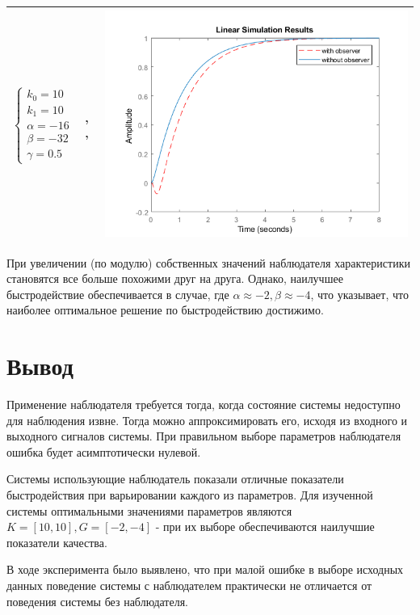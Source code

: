 \begin{longtable}{ | m{2cm} | m{4cm} | m{10cm} | }
		$\begin{cases} k_0=10 \\ k_1=10 \\ \alpha=-16 \\ \beta= -32 \\ \gamma=0.5 \end{cases}$ &
		\text{С наблюдателем:}\linebreak
		\text{$\Omega=8.61$}, \text{$MinRe=0.97$} 
		\text{Без наблюдателя:}\linebreak
		\text{$\Omega=3.27$}, \text{$MinRe=0.97$} & 
		\begin{minipage}{.3\textwidth}
			\includegraphics[scale = 0.6]{images/g3.png}
		\end{minipage}
		\\\hline
		
\end{longtable}

\FloatBarrier

При увеличении (по модулю) собственных значений наблюдателя характеристики становятся все больше похожими друг на друга. Однако, наилучшее быстродействие обеспечивается в случае, где $\alpha\approx-2, \beta\approx-4$, что указывает, что наиболее оптимальное решение по быстродействию достижимо.

\section{Вывод}

Применение наблюдателя требуется тогда, когда состояние системы недоступно для наблюдения извне. Тогда можно аппроксимировать его, исходя из входного и выходного сигналов системы. При правильном выборе параметров наблюдателя ошибка будет асимптотически нулевой.

Системы использующие наблюдатель показали отличные показатели быстродействия при варьировании каждого из параметров. Для изученной системы оптимальными значениями параметров являются $K=[10, 10], G=[-2, -4]$ - при их выборе обеспечиваются наилучшие показатели качества.

В ходе эксперимента было выявлено, что при малой ошибке в выборе исходных данных поведение системы с наблюдателем практически не отличается от поведения системы без наблюдателя.


